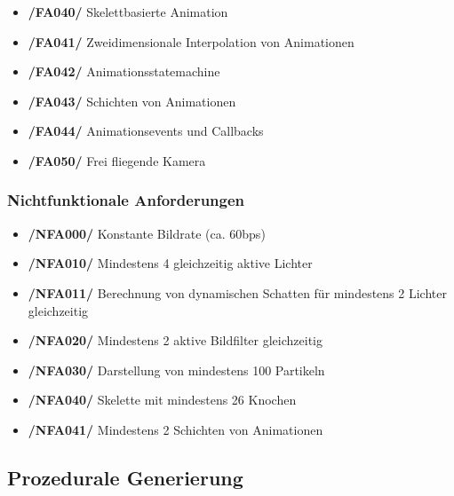 \documentclass[parskip=full]{scrartcl}
\begin{document}
\begin{itemize}[label={}]
		\item \textbf{/FA040/} Skelettbasierte Animation
		\item \textbf{/FA041/} Zweidimensionale Interpolation von Animationen
		\item \textbf{/FA042/} Animationsstatemachine
		\item \textbf{/FA043/} Schichten von Animationen
		\item \textbf{/FA044/} Animationsevents und Callbacks
		
		\item \textbf{/FA050/} Frei fliegende Kamera
	\end{itemize}

	
	\subsubsection{Nichtfunktionale Anforderungen}
	\begin{itemize}[label={}]
		\item \textbf{/NFA000/} Konstante Bildrate (ca. 60bps)
		\item \textbf{/NFA010/} Mindestens 4 gleichzeitig aktive Lichter
		\item \textbf{/NFA011/} Berechnung von dynamischen Schatten für mindestens 2 Lichter gleichzeitig
		\item \textbf{/NFA020/} Mindestens 2 aktive Bildfilter gleichzeitig
		\item \textbf{/NFA030/} Darstellung von mindestens 100 Partikeln
		\item \textbf{/NFA040/} Skelette mit mindestens 26 Knochen
		\item \textbf{/NFA041/} Mindestens 2 Schichten von Animationen
	\end{itemize}
	
	\pagebreak
	
	\subsection{Prozedurale Generierung}
\end{document}
